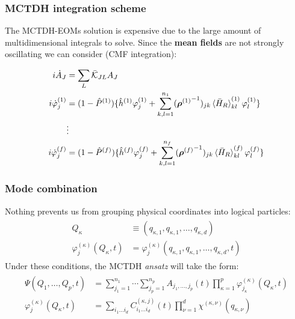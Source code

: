\documentclass{beamer}
\begin{document}
\begin{frame}
  \frametitle{MCTDH integration scheme}
  The MCTDH-EOMs solution is expensive due to the large amount of multidimensional integrals to solve. Since the \textbf{mean fields} are not strongly oscillating we can consider (CMF integration):
  \begin{block}{}
\begin{align}
\begin{split}
i\dot{A}_J &= \sum_L \bar{\mathcal{K}}_{JL}A_J \\
i\dot{\varphi}^{(1)}_j &= (1 - \hat{P}^{(1)})\{\hat{h}^{(1)}\varphi^{(1)}_j + \sum_{k,l=1}^{n_{1}}({\bm{\rho}^{(1)}}^{-1})_{jk}\braket{\bar{H}_R}_{kl}^{(1)}\varphi^{(1)}_l\} \\
           &\vdots \\
i\dot{\varphi}^{(f)}_j &= (1 - \hat{P}^{(f)})\{\hat{h}^{(f)}\varphi^{(f)}_j + \sum_{k,l=1}^{n_{f}}({\bm{\rho}^{(f)}}^{-1})_{jk}\braket{\bar{H}_R}_{kl}^{(f)}\varphi^{(f)}_l\}  
\label{mctdh_eom_mod_dec}
\end{split}	
\end{align}
\end{block}
  
\end{frame}
\begin{frame}
  \frametitle{Mode combination}
  Nothing prevents us from grouping physical coordinates into logical particles:
\begin{align}
\begin{split}
	Q_{\kappa} &\equiv (q_{\kappa,1}, q_{\kappa,1}, \ldots, q_{\kappa,d}) \\
	\varphi_{j}^{(\kappa)}(Q_{\kappa}, t) &= \varphi_{j}^{(\kappa)}(q_{\kappa,1}, q_{\kappa,1}, \ldots, q_{\kappa,d}, t)
\end{split}
\end{align}
Under these conditions, the MCTDH \emph{ansatz} will take the form:
\begin{align}
  \begin{split}
    \Psi(Q_1,\ldots, Q_p, t) &= \sum^{n_1}_{j_1=1}\cdots\sum^{n_p}_{j_p=1}A_{j_1,\ldots,j_p}(t)\prod^{p}_{\kappa=1}\varphi^{(\kappa)}_{j_{\kappa}}(Q_{\kappa}, t) \\
	\varphi_{j}^{(\kappa)}(Q_{\kappa}, t) &= \sum_{i_1 \ldots i_d} C^{(\kappa, j)}_{i_1 \ldots i_d}(t)\prod^{d}_{\nu=1}
	\chi^{(\kappa, \nu)}(q_{\kappa, \nu})
  \end{split}
	\label{mctdh_antz_mc}
\end{align}
  
\end{frame}
\end{document}

